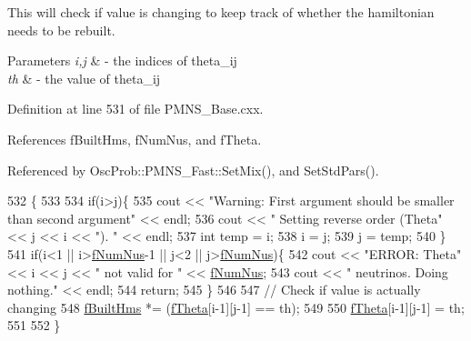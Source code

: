 This will check if value is changing to keep track of whether the hamiltonian needs to be rebuilt.


\begin{DoxyParams}{Parameters}
{\em i,j} & -\/ the indices of theta\+\_\+ij \\
\hline
{\em th} & -\/ the value of theta\+\_\+ij \\
\hline
\end{DoxyParams}


Definition at line 531 of file P\+M\+N\+S\+\_\+\+Base.\+cxx.



References f\+Built\+Hms, f\+Num\+Nus, and f\+Theta.



Referenced by Osc\+Prob\+::\+P\+M\+N\+S\+\_\+\+Fast\+::\+Set\+Mix(), and Set\+Std\+Pars().


\begin{DoxyCode}
532 \{
533 
534   \textcolor{keywordflow}{if}(i>j)\{
535     cout << \textcolor{stringliteral}{"Warning: First argument should be smaller than second argument"} << endl;
536     cout << \textcolor{stringliteral}{"         Setting reverse order (Theta"} << j << i << \textcolor{stringliteral}{"). "} << endl;
537     \textcolor{keywordtype}{int} temp = i;
538     i = j;
539     j = temp;
540   \}
541   \textcolor{keywordflow}{if}(i<1 || i>\hyperlink{classOscProb_1_1PMNS__Base_a24bb74bed63569dfe88b18fa6a08060e}{fNumNus}-1 || j<2 || j>\hyperlink{classOscProb_1_1PMNS__Base_a24bb74bed63569dfe88b18fa6a08060e}{fNumNus})\{
542     cout << \textcolor{stringliteral}{"ERROR: Theta"} << i << j << \textcolor{stringliteral}{" not valid for "} << \hyperlink{classOscProb_1_1PMNS__Base_a24bb74bed63569dfe88b18fa6a08060e}{fNumNus};
543     cout << \textcolor{stringliteral}{" neutrinos. Doing nothing."} << endl;
544     \textcolor{keywordflow}{return};
545   \}
546 
547   \textcolor{comment}{// Check if value is actually changing}
548   \hyperlink{classOscProb_1_1PMNS__Base_a9ac3cadeac8db1b90f3152f476244780}{fBuiltHms} *= (\hyperlink{classOscProb_1_1PMNS__Base_a1976887cd658dd86b2336c181f1470b4}{fTheta}[i-1][j-1] == th);
549 
550   \hyperlink{classOscProb_1_1PMNS__Base_a1976887cd658dd86b2336c181f1470b4}{fTheta}[i-1][j-1] = th;
551 
552 \}
\end{DoxyCode}
